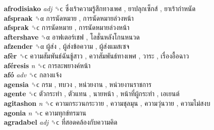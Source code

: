 \textbf{afrodisiako} \emph{adj}  ␝ϲ   ซึ่งเร้าความรู้สึกทางเพศ ,  ยาปลุกเซ็กส์ ,  ยาเร้ากำหนัด   \\
\textbf{afspraak} ␝α   การนัดหมาย ,  การนัดหมายล่วงหน้า   \\
\textbf{afsprak} ␝ϲ   การนัดหมาย ,  การนัดหมายล่วงหน้า   \\
\textbf{aftershave} ␝α   อาฟเตอร์เชฟ ,  โลชั่นหลังโกนหนวด   \\
\textbf{afzender} ␝α   ผู้ส่ง ,  ผู้ส่งข้อความ ,  ผู้ส่งแมสเซจ   \\
\textbf{afèr} ␝ϲ   ความสัมพันธ์ฉันชู้สาว ,  ควาสัมพันธ์ทางเพศ ,  วาระ ,  เรื่องอื้อฉาว   \\
\textbf{aféresis} \emph{n}  ␝ϲ   การละพยางค์หน้า   \\
\textbf{afó} \emph{adv}  ␝ϲ   กลางแจ้ง   \\
\textbf{agensia} ␝ϲ   กรม ,  ทบวง ,  หน่วยงาน ,  หน่วยงานราชการ   \\
\textbf{agente} ␝ϲ   ตัวกระทำ ,  ตัวแทน ,  นายหน้า ,  หน้าที่ผู้กระทำ ,  เอเยนต์   \\
\textbf{agitashon} \emph{n}  ␝ϲ   ความกระวนกระวาย ,  ความชุลมุน ,  ความวุ่นวาย ,  ความไม่สงบ   \\
\textbf{agonia} \emph{n}  ␝ϲ   ความทุกข์ทรมาน   \\
\textbf{agradabel} \emph{adj}  ␝ϲ   ที่สอดคล้องกับความคิด   \\
